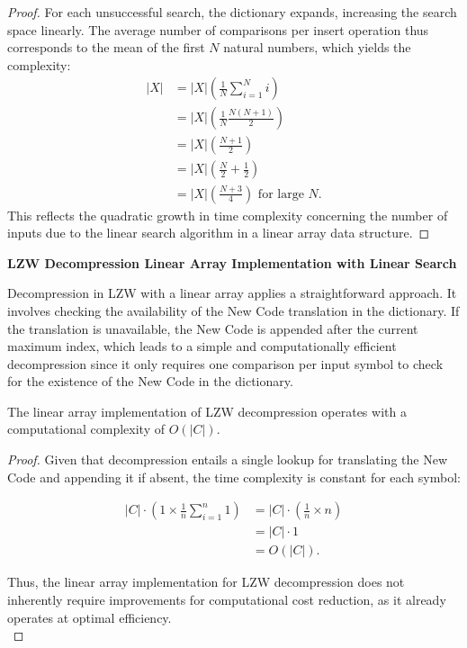 \documentclass[12pt, a4paper]{article}
\begin{document}
\begin{proof}
For each unsuccessful search, the dictionary expands, increasing the search space linearly. The average number of comparisons per insert operation thus corresponds to the mean of the first \( N \) natural numbers, which yields the complexity:
\begin{align*}
    |X| & = |X|\left(\frac{1}{N} \sum_{i=1}^{N} i \right) \\
    & = |X|\left(\frac{1}{N} \frac{N(N + 1)}{2}\right) \\
    & = |X|\left(\frac{N + 1}{2}\right) \\
    & = |X|\left(\frac{N}{2} + \frac{1}{2}\right) \\
    & = |X|\left(\frac{N + 3}{4}\right) \text{ for large } N.
\end{align*}
This reflects the quadratic growth in time complexity concerning the number of inputs due to the linear search algorithm in a linear array data structure.
\end{proof}


\textbf{LZW Decompression Linear Array Implementation with Linear Search}

Decompression in LZW with a linear array applies a straightforward approach. It involves checking the availability of the New Code translation in the dictionary. If the translation is unavailable, the New Code is appended after the current maximum index, which leads to a simple and computationally efficient decompression since it only requires one comparison per input symbol to check for the existence of the New Code in the dictionary.

\begin{theorem}
The linear array implementation of LZW decompression operates with a computational complexity of \( O(|C|) \).
\end{theorem}

\begin{proof}
Given that decompression entails a single lookup for translating the New Code and appending it if absent, the time complexity is constant for each symbol:

\begin{align*}
|C| \cdot \left( 1 \times \frac{1}{n} \sum_{i=1}^{n} 1 \right) &= |C| \cdot \left( \frac{1}{n} \times n \right) \\
&= |C| \cdot 1 \\
&= O(|C|).
\end{align*}

Thus, the linear array implementation for LZW decompression does not inherently require improvements for computational cost reduction, as it already operates at optimal efficiency.\\
\end{proof}
\end{document}
